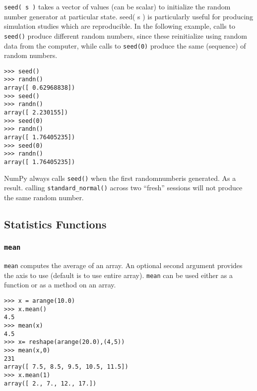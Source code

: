 \documentclass[KSmain.tex]{subfiles}
\begin{document}
\texttt{seed( s )} takes a vector of values (can be scalar) to
initialize the random number generator at particular state. seed( s ) is particularly useful for producing
simulation studies which are reproducible. In the following example, calls to \texttt{seed()} produce different
random numbers, since these reinitialize using random data from the computer, while calls to \texttt{seed(0)}
produce the same (sequence) of random numbers.
\begin{framed}
\begin{verbatim}
>>> seed()
>>> randn()
array([ 0.62968838])
>>> seed()
>>> randn()
array([ 2.230155])
>>> seed(0)
>>> randn()
array([ 1.76405235])
>>> seed(0)
>>> randn()
array([ 1.76405235])
\end{verbatim}
\end{framed}
NumPy always calls \texttt{seed()}  when the first randomnumberis generated. As a result. calling \texttt{standard\_normal()}
across two “fresh” sessions will not produce the same random number.


\subsection{Statistics Functions}
\subsubsection*{\texttt{mean}}
\texttt{mean} computes the average of an array. An optional second argument provides the axis to use (default is
to use entire array). \texttt{mean} can be used either as a function or as a method on an array.
\begin{framed}
\begin{verbatim}
>>> x = arange(10.0)
>>> x.mean()
4.5
>>> mean(x)
4.5
>>> x= reshape(arange(20.0),(4,5))
>>> mean(x,0)
231
array([ 7.5, 8.5, 9.5, 10.5, 11.5])
>>> x.mean(1)
array([ 2., 7., 12., 17.])
\end{verbatim}
\end{framed}
\end{document}
